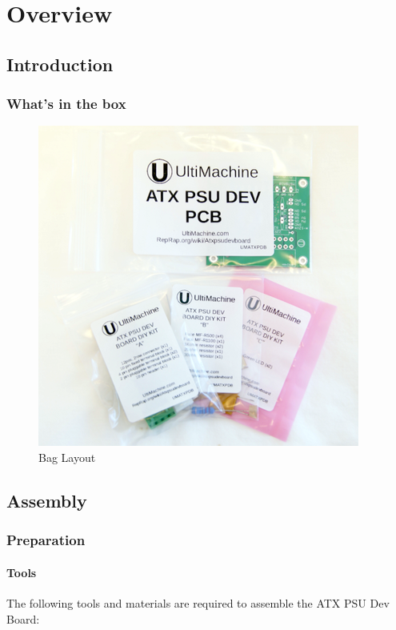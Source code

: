 \section{Overview}

\subsection{Introduction}

\subsubsection{What's in the box}

\begin{figure}[H]
\centering
\includegraphics{./png/kit.png}
\caption{Bag Layout}
\end{figure}

\subsection{Assembly}

\subsubsection{Preparation}

\paragraph{Tools}

The following tools and materials are required to assemble the ATX PSU
Dev Board:

